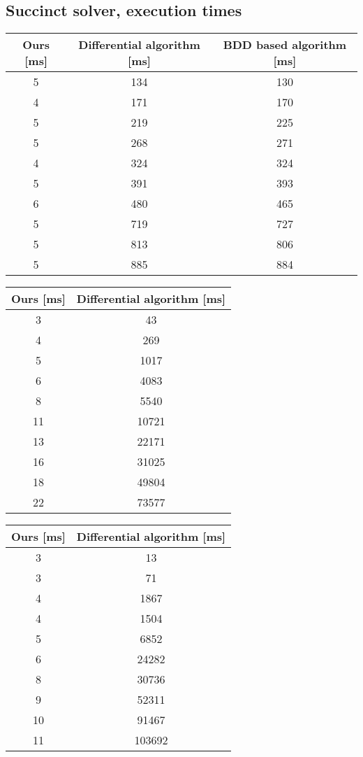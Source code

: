 \subsection{Succinct solver, execution times}
\begin{center}
	\begin{tabular}{ | c | c | c | }
		\hline
		Ours [ms] & Differential algorithm [ms] & BDD based algorithm [ms] \\
		\hline
		\hline
		5 & 134 & 130 \\
		4 & 171 & 170 \\
		5 & 219 & 225 \\
		5 & 268 & 271 \\
		4 & 324 & 324 \\
		5 & 391 & 393 \\
		6 & 480 & 465 \\
		5 & 719 & 727 \\
		5 & 813 & 806 \\
		5 & 885 & 884 \\
		\hline
	\end{tabular}
\end{center}

\begin{center}
	\begin{tabular}{ | c | c | }
		\hline
		Ours [ms] & Differential algorithm [ms] \\
		\hline
		\hline
		3 & 43 \\
		4 & 269 \\
		5 & 1017 \\
		6 & 4083 \\
		8 & 5540 \\
		11 & 10721 \\
		13 & 22171 \\
		16 & 31025 \\
		18 & 49804 \\
		22 & 73577 \\
		\hline
	\end{tabular}
\end{center}

\begin{center}
	\begin{tabular}{ | c | c | }
		\hline
		Ours [ms] & Differential algorithm [ms] \\
		\hline
		\hline
		3 & 13 \\
		3 & 71 \\
		4 & 1867 \\
		4 & 1504 \\
		5 & 6852 \\
		6 & 24282 \\
		8 & 30736 \\
		9 & 52311 \\
		10 & 91467 \\
		11 & 103692 \\
		\hline
	\end{tabular}
\end{center}
